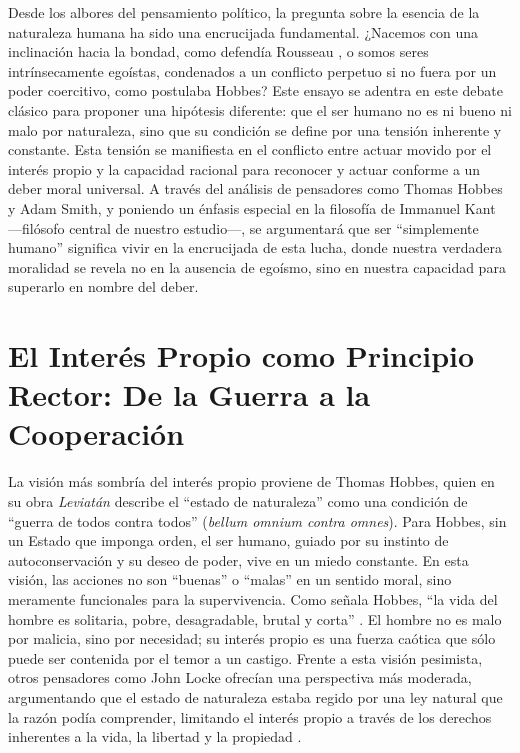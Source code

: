 \documentclass[12pt, a4paper]{article}
\begin{document}
Desde los albores del pensamiento político, la pregunta sobre la esencia de la naturaleza humana ha sido una encrucijada fundamental. ¿Nacemos con una inclinación hacia la bondad, como defendía Rousseau \autocite{Rousseau1755}, o somos seres intrínsecamente egoístas, condenados a un conflicto perpetuo si no fuera por un poder coercitivo, como postulaba Hobbes? Este ensayo se adentra en este debate clásico para proponer una hipótesis diferente: que el ser humano no es ni bueno ni malo por naturaleza, sino que su condición se define por una tensión inherente y constante. Esta tensión se manifiesta en el conflicto entre actuar movido por el interés propio y la capacidad racional para reconocer y actuar conforme a un deber moral universal. A través del análisis de pensadores como Thomas Hobbes y Adam Smith, y poniendo un énfasis especial en la filosofía de Immanuel Kant —filósofo central de nuestro estudio—, se argumentará que ser ``simplemente humano'' significa vivir en la encrucijada de esta lucha, donde nuestra verdadera moralidad se revela no en la ausencia de egoísmo, sino en nuestra capacidad para superarlo en nombre del deber.

\section*{El Interés Propio como Principio Rector: De la Guerra a la Cooperación}

La visión más sombría del interés propio proviene de Thomas Hobbes, quien en su obra \textit{Leviatán} describe el ``estado de naturaleza'' como una condición de ``guerra de todos contra todos'' (\textit{bellum omnium contra omnes}). Para Hobbes, sin un Estado que imponga orden, el ser humano, guiado por su instinto de autoconservación y su deseo de poder, vive en un miedo constante. En esta visión, las acciones no son ``buenas'' o ``malas'' en un sentido moral, sino meramente funcionales para la supervivencia. Como señala Hobbes, ``la vida del hombre es solitaria, pobre, desagradable, brutal y corta'' \autocite[p.~107]{Hobbes1651}. El hombre no es malo por malicia, sino por necesidad; su interés propio es una fuerza caótica que sólo puede ser contenida por el temor a un castigo. Frente a esta visión pesimista, otros pensadores como John Locke ofrecían una perspectiva más moderada, argumentando que el estado de naturaleza estaba regido por una ley natural que la razón podía comprender, limitando el interés propio a través de los derechos inherentes a la vida, la libertad y la propiedad \autocite{Locke1689}.
\end{document}
